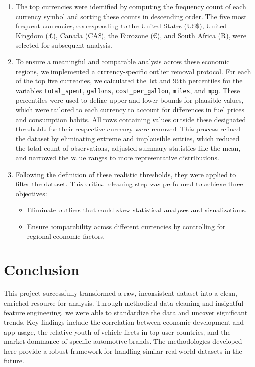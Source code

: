 \documentclass{article}
\begin{document}
\begin{enumerate}
    \item The top currencies were identified by computing the frequency count of each currency symbol and sorting these counts in descending order. The five most frequent currencies, corresponding to the United States (US\$), United Kingdom (£), Canada (CA\$), the Eurozone (€), and South Africa (R), were selected for subsequent analysis.

    \item To ensure a meaningful and comparable analysis across these economic regions, we implemented a currency-specific outlier removal protocol. For each of the top five currencies, we calculated the 1st and 99th percentiles for the variables \texttt{total\_spent}, \texttt{gallons}, \texttt{cost\_per\_gallon}, \texttt{miles}, and \texttt{mpg}. These percentiles were used to define upper and lower bounds for plausible values, which were tailored to each currency to account for differences in fuel prices and consumption habits. All rows containing values outside these designated thresholds for their respective currency were removed. This process refined the dataset by eliminating extreme and implausible entries, which reduced the total count of observations, adjusted summary statistics like the mean, and narrowed the value ranges to more representative distributions.

    \item Following the definition of these realistic thresholds, they were applied to filter the dataset. This critical cleaning step was performed to achieve three objectives:
    \begin{itemize}
        \item Eliminate outliers that could skew statistical analyses and visualizations.
        \item Ensure comparability across different currencies by controlling for regional economic factors.
    \end{itemize}
\end{enumerate}

\section{Conclusion}
This project successfully transformed a raw, inconsistent dataset into a clean, enriched resource for analysis. Through methodical data cleaning and insightful feature engineering, we were able to standardize the data and uncover significant trends. Key findings include the correlation between economic development and app usage, the relative youth of vehicle fleets in top user countries, and the market dominance of specific automotive brands. The methodologies developed here provide a robust framework for handling similar real-world datasets in the future.
\end{document}
